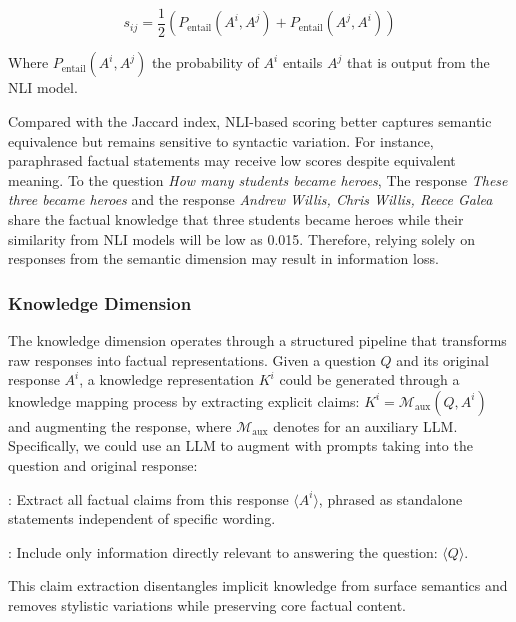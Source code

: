\begin{equation}
s_{ij} = \frac{1}{2}\left(P_{\text{entail}}(A^i,A^j) + P_{\text{entail}}(A^j,A^i)\right)
\end{equation}

Where $P_{\text{entail}}(A^i,A^j)$ the probability of $A^i$ entails $A^j$ that is output from the NLI model.

Compared with the Jaccard index, NLI-based scoring better captures semantic equivalence but remains sensitive to syntactic variation. For instance, paraphrased factual statements may receive low scores despite equivalent meaning. To the question \textit{How many students became heroes}, The response \textit{These three became heroes} and the response \textit{Andrew Willis, Chris Willis, Reece Galea} share the factual knowledge that three students became heroes while their similarity from NLI models will be low as 0.015. Therefore, relying solely on responses from the semantic dimension may result in information loss.

\subsubsection{Knowledge Dimension} 
\label{subsubsec:knowledge}

The knowledge dimension operates through a structured pipeline that transforms raw responses into factual representations. 
Given a question $Q$ and its original response $A^i$, a knowledge representation $K^i$ could be generated through a knowledge mapping process by extracting explicit claims: $K^i = \mathcal{M}_{\text{aux}}(Q, A^i)$ and augmenting the response, where  $\mathcal{M}_{\text{aux}}$ denotes for an auxiliary LLM. Specifically, we could use an LLM to augment with prompts taking into the question and original response:

\begin{tcolorbox}[colback=gray!5!white, colframe=gray!75!green, title=\textbf{Prompt Example for Knowledge Mapping}] 

 : Extract all factual claims from this response $\langle A^i \rangle$, phrased as standalone statements independent of specific wording. 

 : Include only information directly relevant to answering the question: $\langle Q \rangle$.

\end{tcolorbox}

This claim extraction disentangles implicit knowledge from surface semantics and removes stylistic variations while preserving core factual content.




